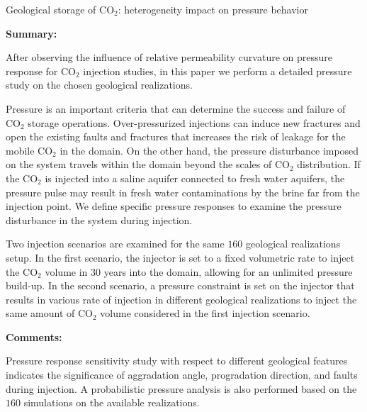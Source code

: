 %
%
{Geological storage of CO$_2$: heterogeneity impact on pressure behavior}
{\textbf{Summary:}

After observing the influence of relative permeability curvature on pressure
response for $\mbox{CO}_2$ injection studies, in this paper we perform a
detailed pressure study on the chosen geological realizations.

Pressure is an important criteria that can determine the success and failure of
$\mbox{CO}_2$ storage operations. Over-pressurized injections can induce
new fractures and open the existing faults and fractures that increases the risk
of leakage for the mobile $\mbox{CO}_2$ in the domain. On the other
hand, the pressure disturbance imposed on the system travels within the
domain beyond the scales of $\mbox{CO}_2$ distribution. If the CO$_2$ is
injected into a saline aquifer connected to fresh water aquifers, the pressure
pulse may result in fresh water contaminations by the brine far from the
injection point. We define specific pressure responses to examine the pressure
disturbance in the system during injection.

Two injection scenarios are examined for the same $160$ geological realizations
setup. In the first scenario, the injector is set to a fixed volumetric rate to
inject the $\mbox{CO}_2$ volume in $30$ years into the domain, allowing for an
unlimited pressure build-up. In the second scenario, a pressure constraint is
set on the injector that results in various rate of injection in different
geological realizations to inject the same amount of $\mbox{CO}_2$ volume
considered in the first injection scenario. 

\vspace{0.5cm}
\noindent\textbf{Comments:}

Pressure response sensitivity study with respect to different geological
features indicates the significance of aggradation angle, progradation
direction, and faults during injection. A probabilistic pressure analysis is
also performed based on the $160$ simulations on the available realizations.
}


